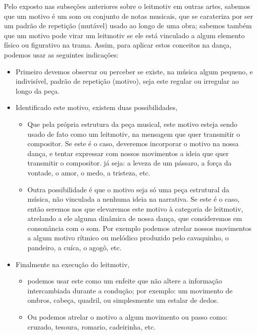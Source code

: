 Pelo exposto nas subseções anteriores sobre o leitmotiv em outras artes,
sabemos que um motivo é um som ou conjunto de notas musicais,
que se carateriza por ser um padrão de repetição (mutável) usado ao longo de uma obra;
sabemos também que um motivo pode virar um leitmotiv se ele está vinculado a algum elemento físico ou figurativo na trama.
Assim, para aplicar estos conceitos  na dança, podemos usar as seguintes indicações:
\begin{itemize}
\item Primeiro devemos observar ou perceber se existe, na música algum pequeno, e indivisível, padrão de repetição (motivo), 
seja este regular ou irregular ao longo da peça.
\item Identificado este motivo, existem duas possibilidades, 
\begin{itemize}
\item Que pela própria estrutura da peça musical, este motivo esteja sendo usado de fato como um leitmotiv, 
na mensagem que quer transmitir o compositor.
Se este é o caso, deveremos incorporar o motivo na nossa dança, 
e tentar expressar com nossos movimentos a ideia que quer transmitir o compositor.
já seja: a leveza de um pássaro, a força da vontade, o amor, o medo, a tristeza, etc.
\item Outra possibilidade é que o motivo seja só uma peça estrutural da música, não vinculada a nenhuma ideia na narrativa.
Se este é o caso, então seremos nos que elevaremos este motivo à categoria de leitmotiv,
atrelando a ele alguma dinâmica de nossa dança, que consideremos em consonância com o som.
 Por exemplo podemos atrelar nossos movimentos a algum motivo rítmico ou melódico produzido pelo cavaquinho, 
o pandeiro, a cuíca, o agogô, etc.
\end{itemize}
\item Finalmente na execução do leitmotiv,
\begin{itemize} 
\item podemos usar este como um enfeite que não altere a informação intercambiada durante a condução;
por exemplo: um movimento de ombros, cabeça, quadril, ou simplesmente um estalar de dedos. 
\item Ou podemos atrelar o motivo a algum movimento ou passo como: cruzado, tesoura, romario, cadeirinha, etc.  
\end{itemize}
\end{itemize}

